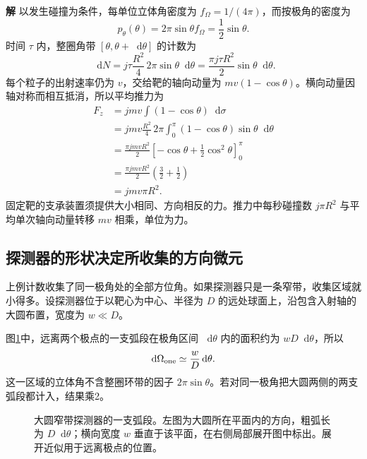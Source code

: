 \documentclass[11pt,openany,fontset=fandol]{ctexbook}
\theoremstyle{definition}\newtheorem{example}{例}[chapter]\newtheorem{exercise}{习题}[chapter]
\newcommand{\SolutionStart}{\par\medskip\ifdim\pagetotal>0pt\ifdim\dimexpr\pagegoal-\pagetotal\relax<3\baselineskip\newpage\fi\fi\noindent\textbf{解}\quad\ignorespaces}
\newenvironment{solution}{\SolutionStart}{\par\medskip}
\newcommand{\dd}{\mathop{}\!\mathrm d}\newcommand{\ee}{\mathrm e}\newcommand{\vct}[1]{\bm{#1}}
\begin{document}
\begin{solution}
以发生碰撞为条件，每单位立体角密度为 $f_\Omega=1/(4\pi)$，而按极角的密度为
\[
p_\theta(\theta)=2\pi\sin\theta f_\Omega=\frac12\sin\theta.
\]
时间 $\tau$ 内，整圈角带 $[\theta,\theta+\dd\theta]$ 的计数为
\[
\dd N=j\tau\frac{R^2}{4}\,2\pi\sin\theta\dd\theta
=\frac{\pi j\tau R^2}{2}\sin\theta\dd\theta.
\]
每个粒子的出射速率仍为 $v$，交给靶的轴向动量为 $mv(1-\cos\theta)$。横向动量因轴对称而相互抵消，所以平均推力为
\begin{align*}
F_z&=jmv\int(1-\cos\theta)\dd\sigma\\
&=jmv\frac{R^2}{4}\,2\pi\int_0^\pi(1-\cos\theta)\sin\theta\dd\theta\\
&=\frac{\pi jmvR^2}{2}\left[-\cos\theta+\frac12\cos^2\theta\right]_0^\pi\\
&=\frac{\pi jmvR^2}{2}\left(\frac32+\frac12\right)\\
&=jmv\pi R^2.
\end{align*}
固定靶的支承装置须提供大小相同、方向相反的力。推力中每秒碰撞数 $j\pi R^2$ 与平均单次轴向动量转移 $mv$ 相乘，单位为力。
\end{solution}

\subsection{探测器的形状决定所收集的方向微元}
上例计数收集了同一极角处的全部方位角。如果探测器只是一条窄带，收集区域就小得多。设探测器位于以靶心为中心、半径为 $D$ 的远处球面上，沿包含入射轴的大圆布置，宽度为 $w\ll D$。

图\ref{mp1:fig:belt}中，远离两个极点的一支弧段在极角区间 $\dd\theta$ 内的面积约为 $wD\dd\theta$，所以
\[
\dd\Omega_{\rm one}\simeq\frac wD\dd\theta.
\]
这一区域的立体角不含整圈环带的因子 $2\pi\sin\theta$。若对同一极角把大圆两侧的两支弧段都计入，结果乘2。

\begin{figure}[H]\centering

\caption{大圆窄带探测器的一支弧段。左图为大圆所在平面内的方向，粗弧长为 $D\dd\theta$；横向宽度 $w$ 垂直于该平面，在右侧局部展开图中标出。展开近似用于远离极点的位置。}\label{mp1:fig:belt}
\end{figure}
\end{document}
